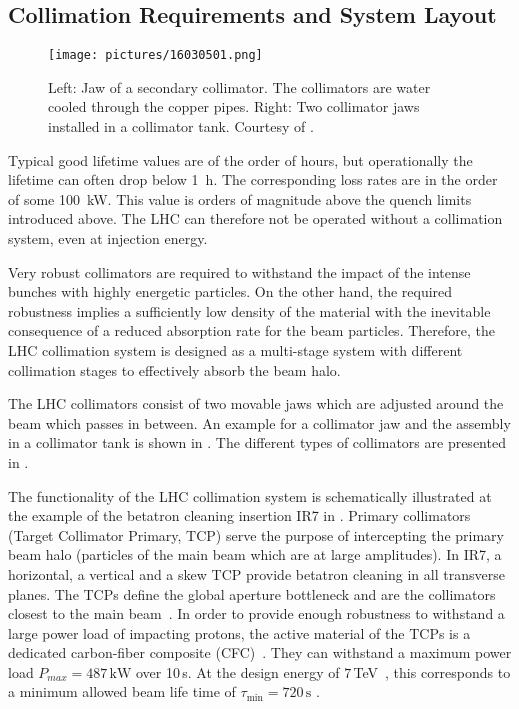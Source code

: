 \subsection{Collimation Requirements and System Layout}
%

\begin{figure}[b]  
    \centering
    \texttt{[image: pictures/16030501.png]}
    \caption{Left: Jaw of a secondary collimator. The collimators are water cooled through the copper pipes. Right: Two collimator jaws installed in a collimator tank. Courtesy of \cite{Bruce2014a}.}  
    \label{pic:16030501}
\end{figure}


Typical good lifetime values are of the order of hours, but operationally the lifetime can often drop below 1~h. The corresponding loss rates are in the order of some 100~kW. This value is orders of magnitude above the quench limits introduced above. The LHC can therefore not be operated without a collimation system, even at injection energy.

Very robust collimators are required to withstand the impact of the intense bunches with highly energetic particles. On the other hand, the required robustness implies a sufficiently low density of the material with the inevitable consequence of a reduced absorption rate for the beam particles. Therefore, the LHC collimation system is designed as a multi-stage system with different collimation stages to effectively absorb the beam halo.  

The LHC collimators consist of two movable jaws which are adjusted around the beam which passes in between. An example for a collimator jaw and the assembly in a collimator tank is shown in . The different types of collimators are presented in .

The functionality of the LHC collimation system is schematically illustrated at the example of the betatron cleaning insertion IR7 in . Primary collimators (Target Collimator Primary, TCP) serve the purpose of intercepting the primary beam halo (particles of the main beam which are at large amplitudes). In IR7, a horizontal, a vertical and a skew TCP provide betatron cleaning in all transverse planes. The TCPs define the global aperture bottleneck and are the collimators closest to the main beam~\citedr. In order to provide enough robustness to withstand a large power load of impacting protons, the active material of the TCPs is a dedicated carbon-fiber composite (CFC)~\citedr. They can withstand a maximum power load $P_{max}= 487\,\text{kW}$ over 10$\,$s. At the design energy of $7\,$TeV~\cite{EPAC02:TUAGB01}, this corresponds to a minimum allowed beam life time of $\tau_\text{min}=720\,\text{s}$ . 


